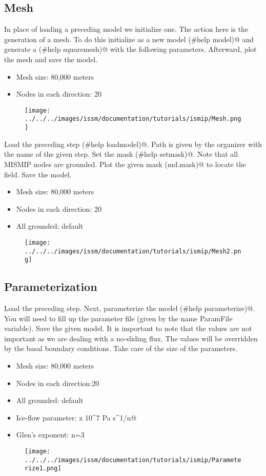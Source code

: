 \subsection{Mesh} %
In place of loading a preceding model we initialize one. The action here is the generation of a mesh. To do this initialize \verb@md@ as a new model \verb@(#help model)@ and generate a \verb@squaremesh@ \verb@(#help squaremesh)@ with the following parameters. Afterward, plot the mesh and save the model.
\begin{itemize}
	\item Mesh size: 80,000 meters
	\item Nodes in each direction: 20
\end{itemize}
\begin{figure}[H]
	\begin{center}
		\texttt{[image: ../../../images/issm/documentation/tutorials/ismip/Mesh.png]}
	\end{center}
\end{figure}
Load the preceding step \verb@(#help loadmodel)@. Path is given by the organizer with the name of the given step. Set the mask \verb@(#help setmask)@. Note that all MISMIP nodes are grounded. Plot the given mask \verb@(md.mask)@ to locate the field. Save the model.
\begin{itemize}
	\item Mesh size: 80,000 meters
	\item Nodes in each direction: 20
	\item All grounded: default
		\end{itemize}
		\begin{figure}[H]
			\begin{center}
				\texttt{[image: ../../../images/issm/documentation/tutorials/ismip/Mesh2.png]}
			\end{center}
		\end{figure}
\subsection{Parameterization} %
Load the preceding step. Next, parameterize the model \verb@(#help parameterize)@. You will need to fill up the parameter file (given by the name ParamFile variable). Save the given model. It is important to note that the values are not important as we are dealing with a no-sliding flux. The values will be overridden by the basal boundary conditions. Take care of the size of the parameters.
\begin{itemize}
	\item Mesh size: 80,000 meters
	\item Nodes in each direction:20
	\item All grounded: default
	\item Ice-flow parameter:  x 10^7 Pa s^1/n@
	\item Glen's exponent: n=3
\end{itemize}
\begin{figure}[H]
	\begin{center}
		\texttt{[image: ../../../images/issm/documentation/tutorials/ismip/Parameterize1.png]}
	\end{center}
\end{figure}
